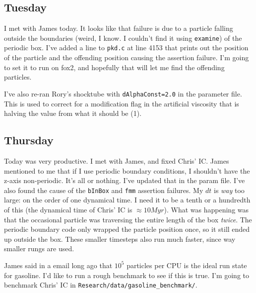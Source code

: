 \documentclass[11pt,letterpaper]{article}
\begin{document}
\subsection*{Tuesday}
I met with James today.  It looks like that failure is due to a particle falling
outside the boundaries (weird, I know.  I couldn't find it using \verb!examine!)
of the periodic box.  I've added a line to \verb!pkd.c! at line 4153 that 
prints out the position of the particle and the offending position causing the
assertion failure.  I'm going to set it to run on fox2, and hopefully that will
let me find the offending particles.

I've also re-ran Rory's shocktube with \verb!dAlphaConst=2.0! in the parameter
file.  This is used to correct for a modification flag in the artificial 
viscosity that is halving the value from what it should be (1).
\subsection*{Thursday}
Today was very productive. I met with James, and fixed Chris' IC.  James 
mentioned to me that if I use periodic boundary conditions, I shouldn't have 
the z-axis non-periodic.  It's all or nothing.  I've updated that in the param
file.  I've also found the cause of the \verb!bInBox! and \verb!fmm! assertion
failures.  My $dt$ is \textit{way} too large:  on the order of one dynamical
time.  I need it to be a tenth or a hundredth of this (the dynamical time
of Chris' IC is $\approx 10 Myr$).  What was happening was that the occasional
particle was traversing the entire length of the box \textit{twice}.  The 
periodic boundary code only wrapped the particle position once, so it still
ended up outside the box.  These smaller timesteps also run much faster, since
way smaller rungs are used.

James said in a email long ago that $10^5$ particles per CPU is the ideal run 
state for gasoline.  I'd like to run a rough benchmark to see if this is true.
I'm going to benchmark Chris' IC in \verb!Research/data/gasoline_benchmark/!.
\end{document}
